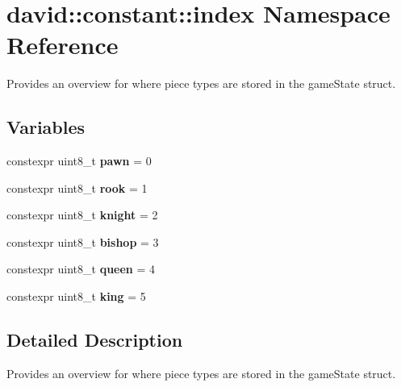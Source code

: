 \hypertarget{namespacedavid_1_1constant_1_1index}{}\section{david\+:\+:constant\+:\+:index Namespace Reference}
\label{namespacedavid_1_1constant_1_1index}


Provides an overview for where piece types are stored in the game\+State struct.  


\subsection*{Variables}
\begin{DoxyCompactItemize}
\item 
\mbox{\label{namespacedavid_1_1constant_1_1index_a35482f18c4e611d4a02a0c9276934cfa}} 
constexpr uint8\+\_\+t {\bfseries pawn} = 0
\item 
\mbox{\label{namespacedavid_1_1constant_1_1index_a821321d4618e92c7642644c57367894f}} 
constexpr uint8\+\_\+t {\bfseries rook} = 1
\item 
\mbox{\label{namespacedavid_1_1constant_1_1index_a23820d3aead4c7743d5d101864b80f59}} 
constexpr uint8\+\_\+t {\bfseries knight} = 2
\item 
\mbox{\label{namespacedavid_1_1constant_1_1index_abfb785706006bcad1b2ed968610d21f5}} 
constexpr uint8\+\_\+t {\bfseries bishop} = 3
\item 
\mbox{\label{namespacedavid_1_1constant_1_1index_ac54d17986c86ffad7a463aaa0f11aade}} 
constexpr uint8\+\_\+t {\bfseries queen} = 4
\item 
\mbox{\label{namespacedavid_1_1constant_1_1index_aea577c51c8b6cac6134ad7223ee62b8f}} 
constexpr uint8\+\_\+t {\bfseries king} = 5
\end{DoxyCompactItemize}


\subsection{Detailed Description}
Provides an overview for where piece types are stored in the game\+State struct. 